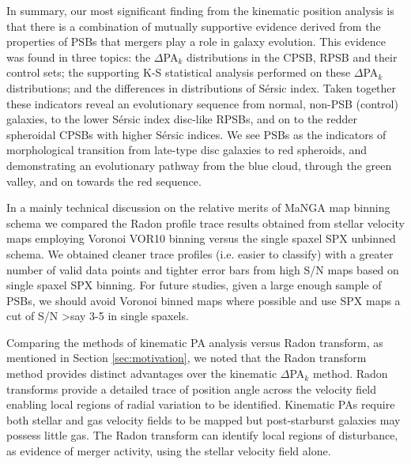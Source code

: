 In summary, our most significant finding from the kinematic position analysis is that there is a combination of mutually supportive evidence derived from the properties of PSBs that mergers play a role in galaxy evolution. This evidence was found in three topics: the $\Delta$PA$_{k}$ distributions in the CPSB, RPSB and their control sets; the supporting K-S statistical analysis performed on these $\Delta$PA$_{k}$ distributions; and the differences in distributions of S\'ersic index. Taken together these indicators reveal an evolutionary sequence from normal, non-PSB (control) galaxies, to the lower S\'ersic index disc-like RPSBs, and on to the redder spheroidal CPSBs with higher S\'ersic indices. We see PSBs as the indicators of morphological transition from late-type disc galaxies to red spheroids, and demonstrating an evolutionary pathway from the blue cloud, through the green valley, and on towards the red sequence.

In a mainly technical discussion on the relative merits of MaNGA map binning schema we compared the Radon profile trace results obtained from stellar velocity maps employing Voronoi VOR10 binning versus the single spaxel SPX unbinned schema. We obtained cleaner trace profiles (i.e. easier to classify) with a greater number of valid data points and tighter error bars from high S/N maps based on single spaxel SPX binning. For future studies, given a large enough sample of PSBs, we should avoid Voronoi binned maps where possible and use SPX maps a cut of S/N \textgreater say 3-5 in single spaxels.

Comparing the methods of kinematic PA analysis versus Radon transform, as mentioned in Section \ref{sec:motivation}, we noted that the Radon transform method provides distinct advantages over the kinematic $\Delta$PA$_{k}$ method. Radon transforms provide a detailed trace of position angle across the velocity field enabling local regions of radial variation to be identified. Kinematic PAs require both stellar and gas velocity fields to be mapped but post-starburst galaxies may possess little gas. The Radon transform can identify local regions of disturbance, as evidence of merger activity, using the stellar velocity field alone.

